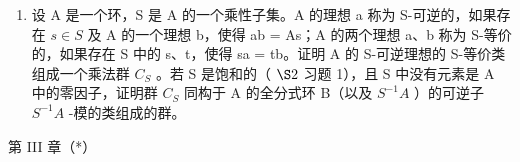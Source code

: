 \begin{enumerate}
\def\labelenumi{\arabic{enumi}.}
\setcounter{enumi}{24}
\tightlist
\item
  设 A 是一个环，S 是 A 的一个乘性子集。A 的理想 a 称为 S-可逆的，如果存在 \(s \in S\) 及 A 的一个理想 b，使得 ab = As；A 的两个理想 a、b 称为 S-等价的，如果存在 S 中的 s、t，使得 sa = tb。证明 A 的 S-可逆理想的 S-等价类组成一个乘法群 \(C_{S}\) 。若 S 是饱和的（ \(\S 2\) 习题 1），且 S 中没有元素是 A 中的零因子，证明群 \(C_{S}\) 同构于 A 的全分式环 B（以及 \(S^{-1}A\) ）的可逆子 \(S^{-1}A\) -模的类组成的群。
\end{enumerate}

第 III 章（*）

